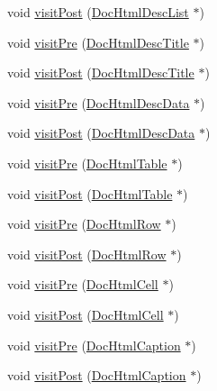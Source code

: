 \begin{DoxyCompactItemize}
\item 
void \hyperlink{class_text_doc_visitor_a26fb5844f17a8131edd7a70fe1086208}{visit\+Post} (\hyperlink{class_doc_html_desc_list}{Doc\+Html\+Desc\+List} $\ast$)
\item 
void \hyperlink{class_text_doc_visitor_a8e576480353131a2e8735307cafb2139}{visit\+Pre} (\hyperlink{class_doc_html_desc_title}{Doc\+Html\+Desc\+Title} $\ast$)
\item 
void \hyperlink{class_text_doc_visitor_ac93768c4b351a0a7071ce8cef3a16d65}{visit\+Post} (\hyperlink{class_doc_html_desc_title}{Doc\+Html\+Desc\+Title} $\ast$)
\item 
void \hyperlink{class_text_doc_visitor_a4fd2327e946998e4379865bdf6ba023c}{visit\+Pre} (\hyperlink{class_doc_html_desc_data}{Doc\+Html\+Desc\+Data} $\ast$)
\item 
void \hyperlink{class_text_doc_visitor_afc58f5995326bc5eae650bc8011a0fb3}{visit\+Post} (\hyperlink{class_doc_html_desc_data}{Doc\+Html\+Desc\+Data} $\ast$)
\item 
void \hyperlink{class_text_doc_visitor_a2fc19bd20aaf78f9030386b4b56e4b27}{visit\+Pre} (\hyperlink{class_doc_html_table}{Doc\+Html\+Table} $\ast$)
\item 
void \hyperlink{class_text_doc_visitor_a0c40377ae00181f021a52c9835bdc991}{visit\+Post} (\hyperlink{class_doc_html_table}{Doc\+Html\+Table} $\ast$)
\item 
void \hyperlink{class_text_doc_visitor_a8093d5a72c0e7c709f98c082e72ececc}{visit\+Pre} (\hyperlink{class_doc_html_row}{Doc\+Html\+Row} $\ast$)
\item 
void \hyperlink{class_text_doc_visitor_a8dc3edb177b09ecdff96b037ec9a9e01}{visit\+Post} (\hyperlink{class_doc_html_row}{Doc\+Html\+Row} $\ast$)
\item 
void \hyperlink{class_text_doc_visitor_ae768d40779728b2d592ffd396759e7ac}{visit\+Pre} (\hyperlink{class_doc_html_cell}{Doc\+Html\+Cell} $\ast$)
\item 
void \hyperlink{class_text_doc_visitor_ab7abfca24c5a3e5b5655168e54701f3e}{visit\+Post} (\hyperlink{class_doc_html_cell}{Doc\+Html\+Cell} $\ast$)
\item 
void \hyperlink{class_text_doc_visitor_a7cf19a288ab811d05eee7645593b9135}{visit\+Pre} (\hyperlink{class_doc_html_caption}{Doc\+Html\+Caption} $\ast$)
\item 
void \hyperlink{class_text_doc_visitor_a128629c0e6f1efac1abb450c4d446238}{visit\+Post} (\hyperlink{class_doc_html_caption}{Doc\+Html\+Caption} $\ast$)
\item 

\end{DoxyCompactItemize}
